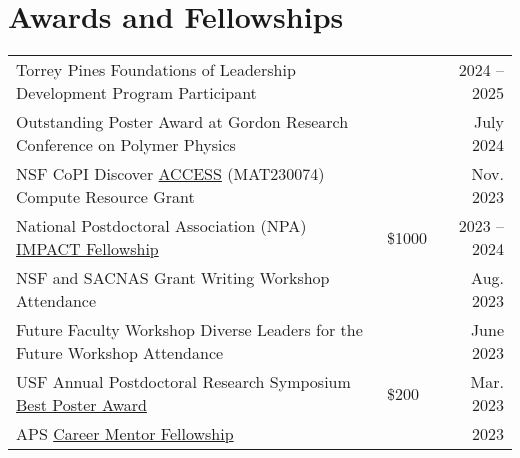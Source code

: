\documentclass[letterpaper,11pt]{article}
\begin{document}
\section*{Awards and Fellowships}
\vspace{-0.6\baselineskip}
\begin{longtable}{@{}p{} p{} r@{}}
  Torrey Pines Foundations of Leadership Development Program Participant                                                                                                                                                              &         & 2024 -- 2025 \\[3pt]
  Outstanding Poster Award at Gordon Research Conference on Polymer Physics                                                                                                                                                           &         & July 2024    \\[3pt]
  NSF CoPI Discover \href{https://access-ci.org/}{ACCESS} (MAT230074) Compute Resource Grant                                                                                                                                          &         & Nov. 2023    \\[3pt]
  National Postdoctoral Association (NPA) \href{https://www.nationalpostdoc.org/general/custom.asp?page=IMPACTProgram}{IMPACT Fellowship}                                                                                             & \$1000  & 2023 -- 2024 \\[3pt]
  NSF and SACNAS Grant Writing Workshop Attendance                                                                                                                                                                                    &         & Aug. 2023    \\[3pt]
  Future Faculty Workshop Diverse Leaders for the Future Workshop Attendance                                                                                                                                                          &         & June 2023    \\[3pt]
  USF Annual Postdoctoral Research Symposium \href{https://www.usf.edu/postdoctoral-affairs/postdoc-services/postdoc-spotlight.aspx#:~:text=BEST\%20POSTERS\%3A-,Pierre\%20Kawak,-Exploring\%20Mechanisms\%20of}{Best Poster Award}   & \$200   & Mar. 2023    \\[3pt]
  APS \href{https://www.aps.org/careers/guidance/mentoring.cfm}{Career Mentor Fellowship}                                                                                                                                             &         & 2023         \\[3pt]

\end{longtable}
\end{document}
